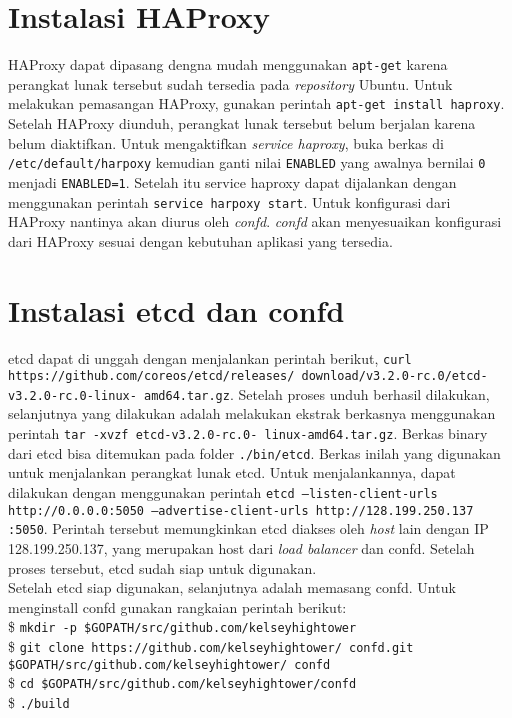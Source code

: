 \section*{Instalasi HAProxy} \label{install:haproxy}
	HAProxy dapat dipasang dengna mudah menggunakan \texttt{apt-get} karena perangkat lunak tersebut sudah tersedia pada \textit{repository} Ubuntu. Untuk melakukan pemasangan HAProxy, gunakan perintah \texttt{apt-get install haproxy}. \\
    \indent Setelah HAProxy diunduh, perangkat lunak tersebut belum berjalan karena belum diaktifkan. Untuk mengaktifkan \textit{service haproxy}, buka berkas di \texttt{/etc/default/harpoxy} kemudian ganti nilai \texttt{ENABLED} yang awalnya bernilai \texttt{0} menjadi \texttt{ENABLED=1}. Setelah itu service haproxy dapat dijalankan dengan menggunakan perintah \texttt{service harpoxy start}.
    \indent Untuk konfigurasi dari HAProxy nantinya akan diurus oleh \textit{confd}. \textit{confd} akan menyesuaikan konfigurasi dari HAProxy sesuai dengan kebutuhan aplikasi yang tersedia.

\section*{Instalasi etcd dan confd} \label{install:etcdconfd}
	etcd dapat di unggah dengan menjalankan perintah berikut, \texttt{curl https://github.com/coreos/etcd/releases/ download/v3.2.0-rc.0/etcd-v3.2.0-rc.0-linux- amd64.tar.gz}. Setelah proses unduh berhasil dilakukan, selanjutnya yang dilakukan adalah melakukan ekstrak berkasnya menggunakan perintah \texttt{tar -xvzf etcd-v3.2.0-rc.0- linux-amd64.tar.gz}. Berkas binary dari etcd bisa ditemukan pada folder \texttt{./bin/etcd}. Berkas inilah yang digunakan untuk menjalankan perangkat lunak etcd. Untuk menjalankannya, dapat dilakukan dengan menggunakan perintah \texttt{etcd --listen-client-urls http://0.0.0.0:5050 --advertise-client-urls http://128.199.250.137 :5050}. Perintah tersebut memungkinkan etcd diakses oleh \textit{host} lain dengan IP 128.199.250.137, yang merupakan host dari \textit{load balancer} dan confd. Setelah proses tersebut, etcd sudah siap untuk digunakan. \\
    \indent Setelah etcd siap digunakan, selanjutnya adalah memasang confd. Untuk menginstall confd gunakan rangkaian perintah berikut: \\
    \$ \texttt{mkdir -p \$GOPATH/src/github.com/kelseyhightower} \\
	\$ \texttt{git clone https://github.com/kelseyhightower/ confd.git \$GOPATH/src/github.com/kelseyhightower/ confd} \\
	\$ \texttt{cd \$GOPATH/src/github.com/kelseyhightower/confd} \\
	\$ \texttt{./build}
	
